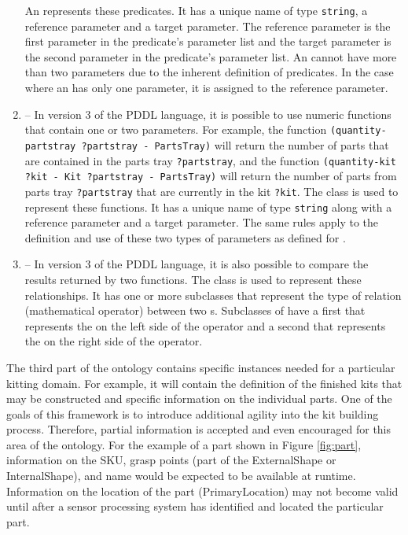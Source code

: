 \begin{enumerate}
An  represents these predicates. It has a unique name of type \texttt{string}, a reference parameter and a target parameter. The reference parameter is the first parameter in the predicate's parameter list and the target parameter is the second parameter in the predicate's parameter list. An  cannot have more than two parameters due to the inherent definition of predicates. In the case where an  has only one parameter, it is assigned to the reference parameter. 
%
\item {} -- In version 3 of the PDDL language, it is possible to use numeric functions that contain one or two parameters. For example, the function \texttt{(quantity-partstray ?partstray - PartsTray)} will return the number of parts that are contained in the parts tray \texttt{?partstray}, and the function
\texttt{(quantity-kit ?kit - Kit ?partstray - PartsTray)} will return the number of parts from parts tray \texttt{?partstray} that are currently in the kit \texttt{?kit}. The class  is used to represent these functions. It has a unique name  of type \texttt{string} along with a reference parameter and a target parameter. The same rules apply to the definition and use of these two types of parameters as defined for .
%
\item {} -- In version 3 of the PDDL language, it is also possible to compare the results returned by two functions. The class  is used to represent these relationships. It has one or more subclasses that represent the type of relation (mathematical operator) between two s. Subclasses of  have a first  that represents the  on the left side of the operator and a second  that represents the  on the right side of the operator.
\end{enumerate}

The third part of the ontology contains specific instances needed for a particular kitting domain. For example, it will contain the definition of the finished kits that may be
constructed and specific information on the individual parts. One of the goals of this framework is to introduce additional agility into the kit building process. Therefore,
partial information is accepted and even encouraged for this area of the ontology. For the example of a part shown in Figure \ref{fig:part}, information on the SKU, grasp points 
(part of the ExternalShape or InternalShape), and name would be expected to be available at runtime. Information on the location of the part (PrimaryLocation) may not
become valid until after a sensor processing system has identified and located the particular part.
%
